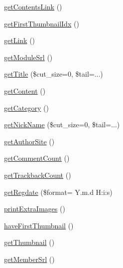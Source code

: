 \begin{DoxyCompactItemize}
\hyperlink{classcontentItem_a80a161de842f1a890fdbfee439674881}{get\+Contents\+Link} ()
\item 
\hyperlink{classcontentItem_a0de8d1dad2347b9f91bc4f16df2c4a12}{get\+First\+Thumbnail\+Idx} ()
\item 
\hyperlink{classcontentItem_a8e5d8c09bab20f5a0cd0874504cf5a5e}{get\+Link} ()
\item 
\hyperlink{classcontentItem_a62686ab7afb76f1239a3824be0e2ded8}{get\+Module\+Srl} ()
\item 
\hyperlink{classcontentItem_aa061be1a76a2d94912440572bd4f875a}{get\+Title} (\$cut\+\_\+size=0, \$tail=\textquotesingle{}...\textquotesingle{})
\item 
\hyperlink{classcontentItem_adb35fd4206e162bccd6ff9f5ac832e09}{get\+Content} ()
\item 
\hyperlink{classcontentItem_ae5a4e97f8f472805fff31340bc095ff3}{get\+Category} ()
\item 
\hyperlink{classcontentItem_a16947acbbeff208471271acd16d5f8f1}{get\+Nick\+Name} (\$cut\+\_\+size=0, \$tail=\textquotesingle{}...\textquotesingle{})
\item 
\hyperlink{classcontentItem_ac8050edaeafe9d6a9c3017185a60576d}{get\+Author\+Site} ()
\item 
\hyperlink{classcontentItem_ae2402a7138ef2a2c9dae2d76aa31228f}{get\+Comment\+Count} ()
\item 
\hyperlink{classcontentItem_a197f56732733f1487d26ed23d29e94a6}{get\+Trackback\+Count} ()
\item 
\hyperlink{classcontentItem_a16a589406fd0206a40ec96810ec75ec1}{get\+Regdate} (\$format= \textquotesingle{}Y.\+m.\+d H\+:i\+:s\textquotesingle{})
\item 
\hyperlink{classcontentItem_acdff242f3298021a7ac9274a4191ebc7}{print\+Extra\+Images} ()
\item 
\hyperlink{classcontentItem_a9e7fa4b2b4b3ce4a066d89b7f862be5a}{have\+First\+Thumbnail} ()
\item 
\hyperlink{classcontentItem_a2d0ac2755de034bee02842e1b4b8179c}{get\+Thumbnail} ()
\item 
\hyperlink{classcontentItem_a3356fefc2abd34642fa229f5a150cbdd}{get\+Member\+Srl} ()
\end{DoxyCompactItemize}
